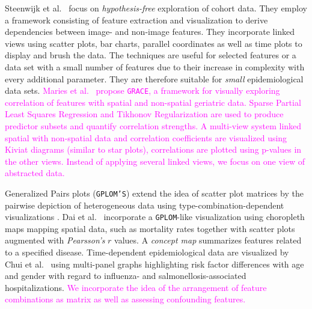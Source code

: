 \documentclass[journal]{style/vgtc} 			          %
\newcommand{\magenta}[1]{\textcolor{magenta}{#1}}
\begin{document}
Steenwijk et al.~\cite{Steenwijk} focus on \emph{hypothesis-free} exploration of cohort data.
They employ a framework consisting of feature extraction and visualization to derive dependencies between image- and non-image features.
They incorporate linked views using scatter plots, bar charts, parallel coordinates as well as time plots to display and brush the data.
The techniques are useful for selected features or a data set with a small number of features due to their increase in complexity with every additional parameter.
They are therefore suitable for \emph{small} epidemiological data sets.
\magenta{
Maries et al.~\cite{GRACE} propose \texttt{GRACE}, a framework for visually exploring correlation of features with spatial and non-spatial geriatric data.
Sparse Partial Least Squares Regression and Tikhonov Regularization are used to produce predictor subsets and quantify correlation strengths.
A multi-view system linked spatial with non-spatial data and correlation coefficients are visualized using Kiviat diagrams (similar to star plots), correlations are plotted using p-values in the other views.
Instead of applying several linked views, we focus on one view of abstracted data.
}

Generalized Pairs plots (\texttt{GPLOM'S}) extend the idea of scatter plot matrices by the pairwise depiction of heterogeneous data using type-combination-dependent visualizations \cite{GPLOMS, Francois2013}.
Dai et al.~\cite{Dai2005} incorporate a \texttt{GPLOM}-like visualization using choropleth maps mapping spatial data, such as mortality rates together with scatter plots augmented with \emph{Pearsson's} $r$ values.
A \emph{concept map} summarizes features related to a specified disease.
Time-dependent epidemiological data are visualized by Chui et al.~\cite{Chui2011} using multi-panel graphs highlighting risk factor differences with age and gender with regard to influenza- and salmonellosis-associated hospitalizations.
\magenta{
We incorporate the idea of the arrangement of feature combinations as matrix as well as assessing confounding features.
}
\end{document}
